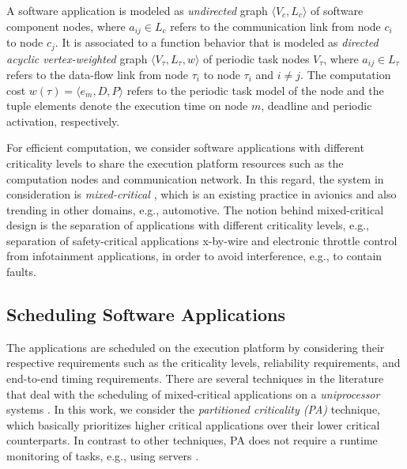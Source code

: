 \begin{definition}
A software application is modeled as \textit{undirected} graph $\langle V_c,L_c\rangle$ of software component nodes, where $a_{ij}\in L_c$ refers to the communication link from node $c_i$ to node $c_j$. It is associated to a function behavior that is modeled as \textit{directed acyclic vertex-weighted} graph $\langle V_\tau,L_\tau, w\rangle$ of periodic task nodes $V_\tau$, where $a_{ij}\in L_\tau$ refers to the data-flow link from node $\tau_i$ to node $\tau_i$ and $i \neq j$. The computation cost $w(\tau)=\langle e_m,D,P\rangle$ refers to the periodic task model of the node and the tuple elements denote the execution time on node $m$, deadline and periodic activation, respectively.
\end{definition}

For efficient computation, we consider software applications with different criticality levels to share the execution platform resources such as the computation nodes and communication network. In this regard, the system in consideration is \textit{mixed-critical} \cite{Vestal2007PreemptiveAssurance}, which is an existing practice in avionics and also trending in other domains, e.g., automotive. The notion behind mixed-critical design is the separation of applications with different criticality levels, e.g., separation of safety-critical applications x-by-wire and electronic throttle control from infotainment applications, in order to avoid interference, e.g., to contain faults.  

\subsection{Scheduling Software Applications}
The applications are scheduled on the execution platform by considering their respective requirements such as the criticality levels, reliability requirements, and end-to-end timing requirements. There are several techniques in the literature that deal with the scheduling of mixed-critical applications on a \textit{uniprocessor} systems \cite{Vestal2007PreemptiveAssurance}. In this work, we consider the \textit{partitioned criticality (PA)}  technique, which basically prioritizes higher critical applications over their lower critical counterparts. In contrast to other techniques, PA does not require a runtime monitoring of tasks, e.g., using servers \cite{AbeniIntegratingSystems,Ashjaei2017DesigningSystems,Inam2014ThePlatforms}.

